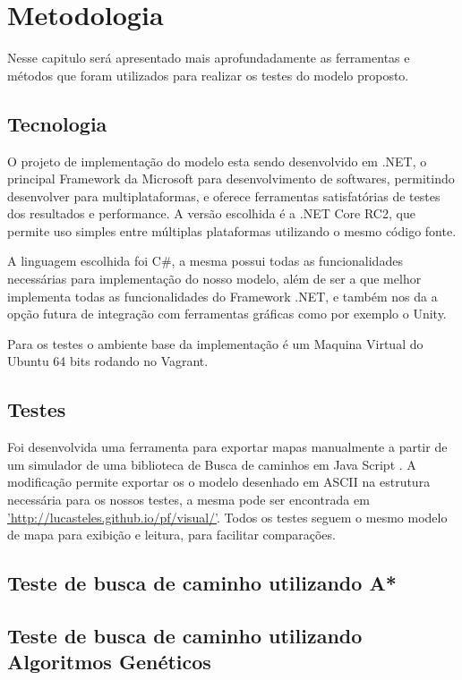 \chapter[Metodologia]{Metodologia}

Nesse capitulo será apresentado mais aprofundadamente as ferramentas e métodos que foram utilizados para realizar os testes do modelo proposto.

\section{Tecnologia}

O projeto de implementação do modelo esta sendo desenvolvido em .NET, o principal Framework da Microsoft para desenvolvimento de softwares, permitindo desenvolver para multiplataformas, e oferece ferramentas satisfatórias de testes dos resultados e performance. A versão escolhida é a .NET Core RC2, que permite uso simples entre múltiplas plataformas utilizando o mesmo código fonte.

A linguagem escolhida foi C\#, a mesma possui todas as funcionalidades necessárias para implementação do nosso modelo, além de ser a que melhor implementa todas as funcionalidades do Framework .NET, e também nos da a opção futura de integração com ferramentas gráficas como por exemplo o Unity.

Para os testes o ambiente base da implementação é um Maquina Virtual do Ubuntu 64 bits rodando no Vagrant.

\section{Testes}

Foi desenvolvida uma ferramenta  para exportar mapas  manualmente a partir de um simulador de uma biblioteca de Busca de caminhos em Java Script \cite{Xueqiao}. A modificação permite exportar os o modelo desenhado em ASCII na estrutura necessária para os nossos testes, a mesma pode ser encontrada em  \hyperref[]{'http://lucasteles.github.io/pf/visual/'}.
Todos os testes seguem o mesmo modelo de mapa para exibição e leitura, para facilitar comparações.

\section{Teste de busca de caminho utilizando A*}

\section{Teste de busca de caminho utilizando Algoritmos Genéticos}
